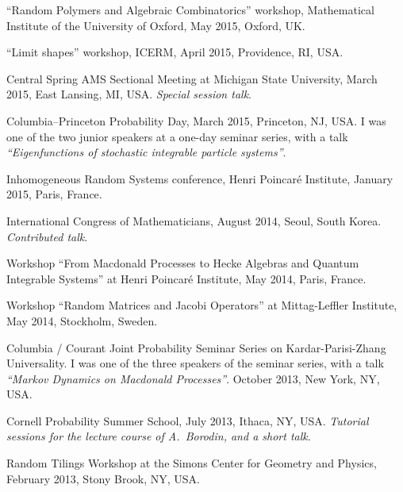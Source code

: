 \documentclass[letterpaper,11pt]{article}
\begin{document}
\begin{etaremune}
\item ``Random Polymers and Algebraic Combinatorics'' workshop, 
Mathematical Institute of the University of Oxford, May 2015, Oxford, UK.

\item ``Limit shapes'' workshop, ICERM, April 2015, Providence, RI, USA. 

\item Central Spring AMS Sectional Meeting at Michigan State University, March 2015, East Lansing, MI, USA. \emph{Special session talk}.

\item Columbia--Princeton Probability Day, March 2015, Princeton, NJ, USA.
I was one of the two junior speakers at a one-day seminar series,
with a talk \emph{``Eigenfunctions of stochastic integrable particle systems''}.

\item Inhomogeneous Random Systems conference, Henri Poincar\'e Institute, January 2015, Paris, France.

\item International Congress of Mathematicians, August 2014, 
Seoul, South Korea. \emph{Contributed talk}.

\item Workshop 
``From Macdonald Processes to Hecke Algebras and Quantum Integrable Systems''
at Henri Poincar\'e Institute,
May 2014, Paris, France.

\item 
Workshop
``Random Matrices and Jacobi Operators''
at 
Mittag-Leffler Institute,
May 2014, Stockholm, Sweden.

\item
Columbia / Courant Joint Probability Seminar Series on Kardar-Parisi-Zhang Universality. 
I was one of the three speakers of the seminar series,
with a talk
\emph{``Markov Dynamics on Macdonald Processes''}.
October 2013, New York, NY, USA.

\item
Cornell Probability Summer School, July 2013, Ithaca, NY, USA.
\emph{Tutorial sessions for the lecture course of 
A.~Borodin, and a short talk}.

\item 
Random Tilings Workshop at the 
Simons Center for Geometry and Physics,
February 2013, Stony Brook, NY, USA.


\end{etaremune}
\end{document}
